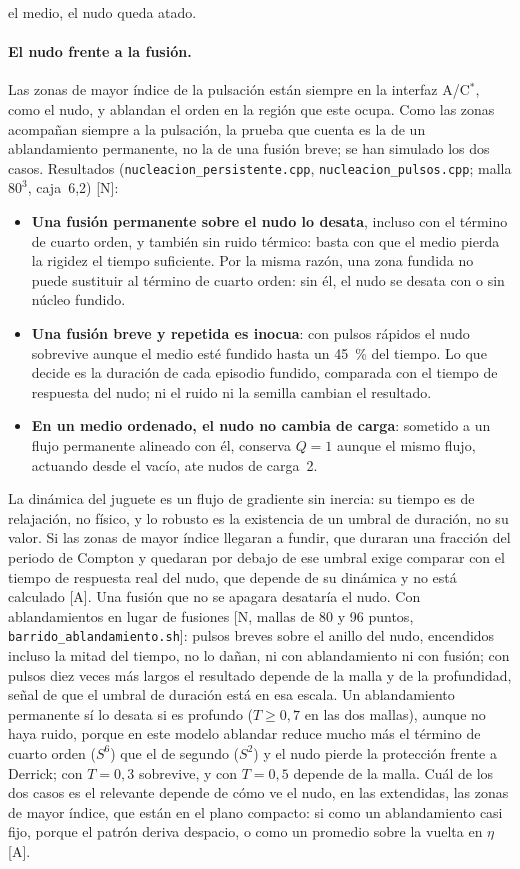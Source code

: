 \documentclass[11pt,a4paper]{article}
\newcommand{\st}[1]{\textup{[#1]}}
\newcommand{\Cst}{C\ensuremath{^{*}}}
\newcommand{\prog}[1]{\texttt{#1}}
\newcommand{\apartado}[1]{\paragraph{#1}}
\begin{document}
el medio, el nudo queda atado.

\apartado{El nudo frente a la fusión.} Las zonas de mayor índice de la pulsación están siempre en la interfaz A/\Cst, como el nudo, y ablandan el orden en la región que este ocupa. Como las zonas acompañan siempre a la pulsación, la prueba que cuenta es la de un ablandamiento permanente, no la de una fusión breve; se han simulado los dos casos. Resultados (\prog{nucleacion\_persistente.cpp}, \prog{nucleacion\_pulsos.cpp}; malla $80^3$, caja~6,2) \st{N}:
\begin{itemize}[leftmargin=*]
\item \textbf{Una fusión permanente sobre el nudo lo desata}, incluso con el término de cuarto orden, y también sin ruido térmico: basta con que el medio pierda la rigidez el tiempo suficiente. Por la misma razón, una zona fundida no puede sustituir al término de cuarto orden: sin él, el nudo se desata con o sin núcleo fundido.
\item \textbf{Una fusión breve y repetida es inocua}: con pulsos rápidos el nudo sobrevive aunque el medio esté fundido hasta un 45~\% del tiempo. Lo que decide es la duración de cada episodio fundido, comparada con el tiempo de respuesta del nudo; ni el ruido ni la semilla cambian el resultado.
\item \textbf{En un medio ordenado, el nudo no cambia de carga}: sometido a un flujo permanente alineado con él, conserva $Q=1$ aunque el mismo flujo, actuando desde el vacío, ate nudos de carga~2.
\end{itemize}
La dinámica del juguete es un flujo de gradiente sin inercia: su tiempo es de relajación, no físico, y lo robusto es la existencia de un umbral de duración, no su valor. Si las zonas de mayor índice llegaran a fundir, que duraran una fracción del periodo de Compton y quedaran por debajo de ese umbral exige comparar con el tiempo de respuesta real del nudo, que depende de su dinámica y no está calculado \st{A}. Una fusión que no se apagara desataría el nudo. Con ablandamientos en lugar de fusiones \st{N, mallas de 80 y 96 puntos, \prog{barrido\_ablandamiento.sh}}: pulsos breves sobre el anillo del nudo, encendidos incluso la mitad del tiempo, no lo dañan, ni con ablandamiento ni con fusión; con pulsos diez veces más largos el resultado depende de la malla y de la profundidad, señal de que el umbral de duración está en esa escala. Un ablandamiento permanente sí lo desata si es profundo ($T\ge0,7$ en las dos mallas), aunque no haya ruido, porque en este modelo ablandar reduce mucho más el término de cuarto orden ($S^6$) que el de segundo ($S^2$) y el nudo pierde la protección frente a Derrick; con $T=0,3$ sobrevive, y con $T=0,5$ depende de la malla. Cuál de los dos casos es el relevante depende de cómo ve el nudo, en las extendidas, las zonas de mayor índice, que están en el plano compacto: si como un ablandamiento casi fijo, porque el patrón deriva despacio, o como un promedio sobre la vuelta en $\eta$ \st{A}.
\end{document}
